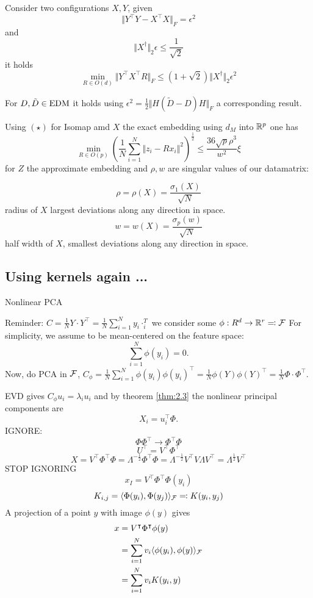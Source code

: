 Consider two configurations $X,Y$, given
\[\Vert Y^\intercal Y-X^\intercal X\Vert_F=\epsilon^2\]
and 
\[\Vert X^\dagger\Vert_2\epsilon\leq \frac{1}{\sqrt{2}}\]
it holds 
\[\min_{R\in O(d)}\Vert Y^\intercal X^\intercal R\Vert_F\leq (1+\sqrt{2})\Vert X^\dagger\Vert_2 \epsilon^2\]

For $D,\tilde{D}\in \text{EDM}$ it holds using $\epsilon^2=\frac{1}{2}\Vert H(\tilde{D}-D)H\Vert_F$ a corresponding result.

Using $(\star)$ for Isomap amd $X$ the exact embedding using $d_M$ into $\mathbb{R}^p$ one has 
\[\min_{R\in O(p)}\left(\frac{1}{N}\sum_{i=1}^N\Vert z_i-R x_i\Vert^2\right)^{\frac{1}{2}}\leq \frac{36\sqrt{p}\rho^3}{w^2}\xi\]
for $Z$ the approximate embedding and $\rho,w$ are singular values of our datamatrix:

\[\rho=\rho(X)=\frac{\sigma_1(X)}{\sqrt{N}}\]
radius of $X$ largest deviations along any direction in space.
\[w=w(X)=\frac{\sigma_p(w)}{\sqrt{N}}\]
half width of $X$, smallest deviations along any direction in space.

\subsection*{Using kernels again ...}

Nonlinear PCA

Reminder: $C=\frac{1}{N}Y\cdot Y^\intercal=\frac{1}{N}\sum_{i=1}^N y_i\cdot _i^T$
we consider some  $\phi:R^d\to\mathbb{R}^r\eqcolon \mathcal{F}$
For simplicity, we assume to be mean-centered on the feature space:
\[\sum_{i=1}^N\phi(y_i)=0.\]
Now, do PCA in $\mathcal{F}$, $C_\phi=\frac{1}{N}\sum_{i=1}^N\phi(y_i)\phi(y_i)^\intercal = \frac{1}{N}\phi(Y)\phi(Y)^\intercal=\frac{1}{N}\Phi\cdot\Phi^\intercal$.

EVD gives $C_\phi u_i=\lambda_i u_i$ and by theorem \ref{thm:2.3}  the nonlinear principal components are 
\[X_i=u_i^\intercal \Phi.\]
IGNORE:
\[\Phi\Phi^\intercal\to \Phi^\intercal \Phi\]
\[U^\intercal=V^\intercal \Phi^\intercal\]
\[X=V^\intercal\Phi^\intercal \Phi=\Lambda^{-\frac{1}{2}}\Phi^\intercal \Phi=\Lambda^{-\frac{1}{2}}V^\intercal V \Lambda V^\intercal=\Lambda^{\frac{1}{2}}V^\intercal\]
STOP IGNORING
\[x_I=V^\intercal \Phi^\intercal\Phi(y_i)\]
\[K_{i,j}=\langle \Phi(y_i),\Phi(y_j) \rangle_{\mathcal{F}}\eqqcolon K(y_i,y_j)\]
A projection of a point $y$ with image $\phi(y)$ gives 
\begin{align*}
    x&=V^\intercal \Phi^\intercal \phi(y)\\
    &=\sum_{i=1}^N v_i\langle \phi(y_i),\phi(y)\rangle_{\mathcal{F}}\\
    &=\sum_{i=1}^N v_i K(y_i,y)
\end{align*}


